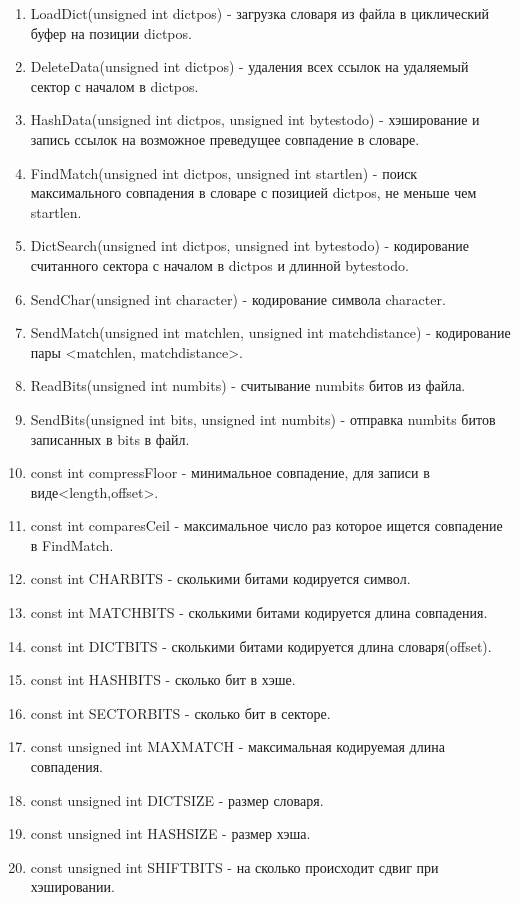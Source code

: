 \documentclass[12pt]{article}
\begin{document}
\begin{enumerate}
	\item LoadDict(unsigned int dictpos) - загрузка словаря из файла в циклический буфер на позиции dictpos.
	\item DeleteData(unsigned int dictpos) - удаления всех ссылок на удаляемый сектор с началом в dictpos.
	\item HashData(unsigned int dictpos, unsigned int bytestodo) - хэширование и запись ссылок на возможное преведущее совпадение в словаре.
	\item FindMatch(unsigned int dictpos, unsigned int startlen) - поиск максимального совпадения в словаре с позицией dictpos, не меньше чем startlen. 
	\item DictSearch(unsigned int dictpos, unsigned int bytestodo) - кодирование считанного сектора с началом в dictpos и длинной bytestodo.
	\item SendChar(unsigned int character) - кодирование символа character.
	\item SendMatch(unsigned int matchlen, unsigned int matchdistance) - кодирование пары <matchlen, matchdistance>.
	\item ReadBits(unsigned int numbits) - считывание numbits битов из файла.
	\item SendBits(unsigned int bits, unsigned int numbits) - отправка numbits битов записанных в bits в файл.
	\item const int compressFloor - минимальное совпадение, для записи в виде<length,offset>.
	\item const int comparesCeil  - максимальное число раз которое ищется совпадение в FindMatch.
	\item const int CHARBITS    - сколькими битами кодируется символ.    
	\item const int MATCHBITS     - сколькими битами кодируется длина совпадения.     
	\item const int DICTBITS     - сколькими битами кодируется длина словаря(offset).     
	\item const int HASHBITS     - сколько бит в хэше.
	\item const int SECTORBITS     - сколько бит в секторе.    
	\item const unsigned int MAXMATCH - максимальная кодируемая длина совпадения.
	\item const unsigned int DICTSIZE - размер словаря.
	\item const unsigned int HASHSIZE - размер хэша.
	\item const unsigned int SHIFTBITS  - на сколько происходит сдвиг при хэшировании.

\end{enumerate}
\end{document}
